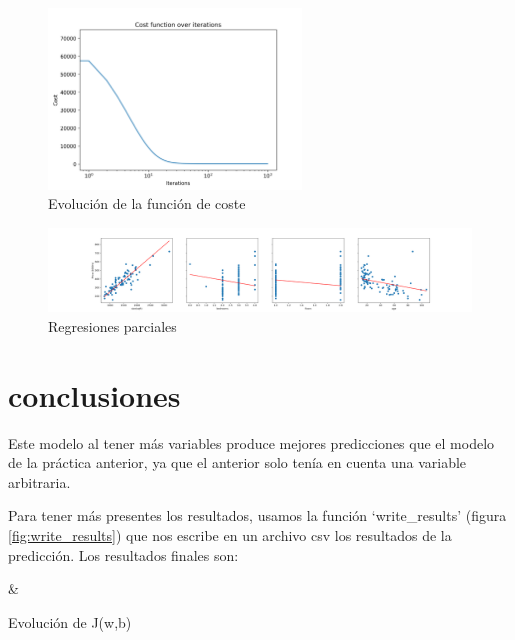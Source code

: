 \documentclass[6pt]{AiTex}
\begin{document}
\begin{figure}[H]
    \centering
    \includegraphics[width=0.6\textwidth]{./images/cost_function.png}
    \caption{Evolución de la función de coste}
    \label{fig:cost}
\end{figure}

\begin{figure}[H]
    \centering
    \includegraphics[width=\textwidth]{./images/partial_regression.png}
    \caption{Regresiones parciales}
    \label{fig:reg_parciales}
\end{figure}

\section{conclusiones}

Este modelo al tener más variables produce mejores predicciones que el modelo de la práctica anterior, ya que el anterior solo tenía en cuenta una variable arbitraria.

Para tener más presentes los resultados, usamos la función `write\_results' (figura \ref{fig:write_results}) que nos escribe en un archivo csv los resultados de la predicción. Los resultados finales son:

\begin{table}[H]
    \centering
    {\casos & \iterativo}
    \caption{Evolución de J(w,b)}
    \label{table:j_history}
\end{table}
\end{document}
